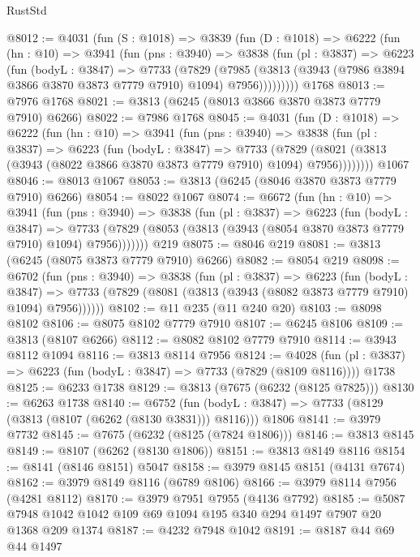 \begin{lexlean}{RustStd}
\begin{coremodule}
@8012 := @4031
    (fun (S : @1018) =>
    @3839
      (fun (D : @1018) =>
      @6222
        (fun (hn : @10) =>
        @3941
          (fun (pns : @3940) =>
          @3838
            (fun (pl : @3837) =>
            @6223
              (fun (bodyL : @3847) =>
              @7733
                (@7829
                  (@7985
                    (@3813 (@3943 (@7986 @3894 @3866 @3870 @3873 @7779 @7910) @1094) @7956)))))))))
    @1768
@8013 := @7976 @1768
@8021 := @3813 (@6245 (@8013 @3866 @3870 @3873 @7779 @7910) @6266)
@8022 := @7986 @1768
@8045 := @4031
    (fun (D : @1018) =>
    @6222
      (fun (hn : @10) =>
      @3941
        (fun (pns : @3940) =>
        @3838
          (fun (pl : @3837) =>
          @6223
            (fun (bodyL : @3847) =>
            @7733
              (@7829 (@8021 (@3813 (@3943 (@8022 @3866 @3870 @3873 @7779 @7910) @1094) @7956))))))))
    @1067
@8046 := @8013 @1067
@8053 := @3813 (@6245 (@8046 @3870 @3873 @7779 @7910) @6266)
@8054 := @8022 @1067
@8074 := @6672
    (fun (hn : @10) =>
    @3941
      (fun (pns : @3940) =>
      @3838
        (fun (pl : @3837) =>
        @6223
          (fun (bodyL : @3847) =>
          @7733 (@7829 (@8053 (@3813 (@3943 (@8054 @3870 @3873 @7779 @7910) @1094) @7956)))))))
    @219
@8075 := @8046 @219
@8081 := @3813 (@6245 (@8075 @3873 @7779 @7910) @6266)
@8082 := @8054 @219
@8098 := @6702
    (fun (pns : @3940) =>
    @3838
      (fun (pl : @3837) =>
      @6223
        (fun (bodyL : @3847) =>
        @7733 (@7829 (@8081 (@3813 (@3943 (@8082 @3873 @7779 @7910) @1094) @7956))))))
@8102 := @11 @235 (@11 @240 @20)
@8103 := @8098 @8102
@8106 := @8075 @8102 @7779 @7910
@8107 := @6245 @8106
@8109 := @3813 (@8107 @6266)
@8112 := @8082 @8102 @7779 @7910
@8114 := @3943 @8112 @1094
@8116 := @3813 @8114 @7956
@8124 := @4028
    (fun (pl : @3837) => @6223 (fun (bodyL : @3847) => @7733 (@7829 (@8109 @8116))))
    @1738
@8125 := @6233 @1738
@8129 := @3813 (@7675 (@6232 (@8125 @7825)))
@8130 := @6263 @1738
@8140 := @6752
    (fun (bodyL : @3847) => @7733 (@8129 (@3813 (@8107 (@6262 (@8130 @3831))) @8116)))
    @1806
@8141 := @3979 @7732
@8145 := @7675 (@6232 (@8125 (@7824 @1806)))
@8146 := @3813 @8145
@8149 := @8107 (@6262 (@8130 @1806))
@8151 := @3813 @8149 @8116
@8154 := @8141 (@8146 @8151) @5047
@8158 := @3979 @8145 @8151 (@4131 @7674)
@8162 := @3979 @8149 @8116 (@6789 @8106)
@8166 := @3979 @8114 @7956 (@4281 @8112)
@8170 := @3979 @7951 @7955 (@4136 @7792)
@8185 := @5087 @7948 @1042 @1042 @109 @69 @1094 @195 @340 @294 @1497 @7907 @20 @1368 @209 @1374
@8187 := @4232 @7948 @1042
@8191 := @8187 @44 @69 @44 @1497

\end{coremodule}
\end{lexlean}
